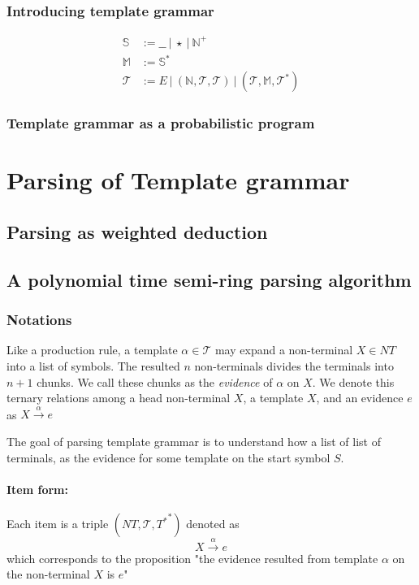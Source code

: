         \subsection{Introducing template grammar}
            \begin{align}
                \mathbb S &:= \_\_ \ | \ \star \ |\  \mathbb N^+ \\
                \mathbb M &:= \mathbb S ^ *\\
                \mathcal T &:= E \ |\  (\mathbb N, \mathcal T, \mathcal T) \ |\  (\mathcal T, \mathbb M, \mathcal T^*)
            \end{align}

            
            

        \subsection{Template grammar as a probabilistic program}
        
\chapter{Parsing of Template grammar}
    \section{Parsing as weighted deduction} 
    \section{A polynomial time semi-ring parsing algorithm}
    \subsection{Notations}
        Like a production rule, a template $\alpha \in \mathcal T$ may expand a non-terminal $X \in NT$ into 
        a list of symbols. The resulted $n$ non-terminals divides the terminals into $n+1$ chunks.
        We call these chunks as the \emph{evidence} of $\alpha$ on $X$. 
        We denote this ternary relations among 
        a head non-terminal $X$, a template $X$, and an evidence $e$ as $X \xrightarrow{\alpha} e$
        
        The goal of parsing template grammar is to understand how 
        a list of list of terminals, as the evidence for some template on the start symbol $S$. 
        \subsubsection{Item form:} 
            Each item is a triple $(NT, \mathcal{T},{T^*}^*)$ denoted as 
            \begin{equation} {X \xrightarrow{\alpha} e}
            \end{equation}
            which corresponds to the proposition "the evidence resulted from 
            template $\alpha$ on the non-terminal $X$ is $e$"
        
